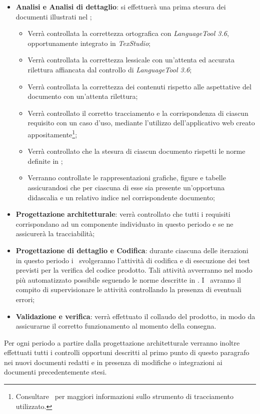 \documentclass[../PianoDiQualifica.tex]{subfiles}
\begin{document}
			\begin{itemize}
				\item \textbf{Analisi e Analisi di dettaglio}: si effettuerà
				una prima stesura dei documenti illustrati nel \pianodiprogettov;
				\begin{itemize}
					\item Verrà controllata la correttezza ortografica con \textit{LanguageTool 3.6},
					opportunamente integrato in \textit{TexStudio};
					\item Verrà controllata la correttezza lessicale con un'attenta ed accurata
					rilettura affiancata dal controllo di \textit{LanguageTool 3.6};
					\item Verrà controllata la correttezza dei contenuti rispetto alle aspettative
					del documento con un'attenta rilettura;
					\item Verrà controllato il corretto tracciamento e la corrispondenza di ciascun
					requisito con un caso d'uso, mediante l'utilizzo dell'applicativo web creato
					appositamente\footnote{Consultare \normediprogettov\ per maggiori informazioni
					sullo strumento di tracciamento utilizzato.};
					\item Verrà controllato che la stesura di ciascun documento rispetti le
					norme definite in \normediprogettov;
					\item Verranno controllate le rappresentazioni grafiche, figure e tabelle
					assicurandosi che per ciascuna di esse sia presente un'opportuna didascalia e
					un relativo indice nel corrispondente documento;
				\end{itemize}
				\item \textbf{Progettazione architetturale}: verrà controllato che tutti i requisiti
				corrispondano ad un componente individuato in questo periodo e se ne assicurerà la
				tracciabilità;
				\item \textbf{Progettazione di dettaglio e Codifica}: durante ciascuna delle
				iterazioni in questo periodo i \programmatori\ svolgeranno l'attività di codifica e di
				esecuzione dei test previsti per la verifica del codice prodotto.
				Tali attività avverranno nel modo più automatizzato possibile seguendo le norme
				descritte in \normediprogettov.
				I \verificatori\ avranno il compito di supervisionare le attività
				controllando la presenza di eventuali errori;
				\item \textbf{Validazione e verifica}: verrà effettuato il collaudo
				del prodotto, in modo da assicurarne il corretto funzionamento al momento
				della consegna.
			\end{itemize}
			Per ogni periodo a partire dalla progettazione architetturale verranno inoltre effettuati
			tutti i controlli opportuni descritti al primo punto di questo paragrafo nei nuovi
			documenti redatti e in presenza	di modifiche o integrazioni	ai documenti
			precedentemente stesi.
\end{document}
